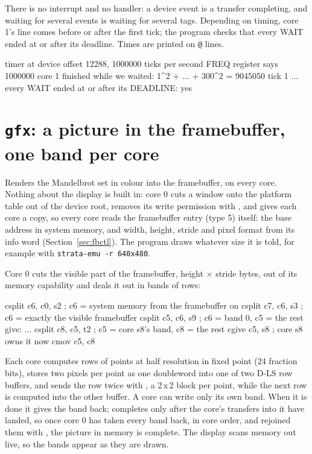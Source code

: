 There is no interrupt and no handler: a device event is a transfer completing, and waiting for several
events is waiting for several tags. Depending on timing, core 1's line comes before or after the first
tick; the program checks that every WAIT ended at or after its deadline. Times are printed on
\texttt{@} lines.

\begin{shell}
timer at device offset 12288, 1000000 ticks per second
FREQ register says 1000000
core 1 finished while we waited: 1^2 + ... + 300^2 = 9045050
tick 1
...
every WAIT ended at or after its DEADLINE: yes
\end{shell}

\section{\texttt{gfx}: a picture in the framebuffer, one band per core}\label{sec:ex-gfx}
Renders the Mandelbrot set in colour into the framebuffer, on every core. Nothing about the display is
built in: core 0 cuts a window onto the platform table out of the device root, removes its write
permission with , and gives each core a copy, so every core reads the framebuffer entry
(type 5) itself: the base address in system memory, and width, height, stride and pixel format from
its info word (Section~\ref{sec:fbctl}). The program draws whatever size it is told, for example with
\texttt{strata-emu -r 640x480}.

Core 0 cuts the visible part of the framebuffer, height $\times$ stride bytes, out of its memory
capability and deals it out in bands of rows:

\begin{asm}
        csplit c6, c0, s2               ; c6 = system memory from the framebuffer on
        csplit c7, c6, s3               ; c6 = exactly the visible framebuffer
        csplit c5, c6, s9               ; c6 = band 0, c5 = the rest
give:
        ...
        csplit c8, c5, t2               ; c5 = core s8's band, c8 = the rest
        cgive c5, s8                    ; core s8 owns it now
        cmov  c5, c8
\end{asm}

Each core computes rows of points at half resolution in fixed point (24 fraction bits), stores two
pixels per point as one doubleword into one of two D-LS row buffers, and sends the row twice with
, a 2\,x\,2 block per point, while the next row is computed into the other buffer. A core can
write only its own band. When it is done it gives the band back;  completes only after the
core's transfers into it have landed, so once core 0 has taken every band back, in core order, and
rejoined them with , the picture in memory is complete. The display scans memory out
live, so the bands appear as they are drawn.


